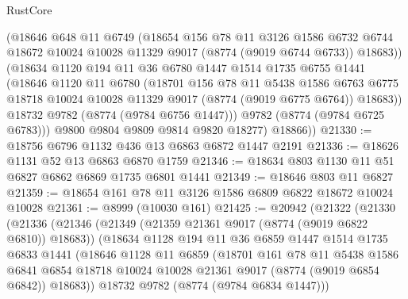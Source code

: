 \begin{lexlean}{RustCore}
\begin{coremodule}
            (@18646
              @648
              @11
              @6749
              (@18654
                @156
                @78
                @11
                @3126
                @1586
                @6732
                @6744
                @18672
                @10024
                @10028
                @11329
                @9017
                (@8774 (@9019 @6744 @6733))
                @18683))
            (@18634
              @1120
              @194
              @11
              @36
              @6780
              @1447
              @1514
              @1735
              @6755
              @1441
              (@18646
                @1120
                @11
                @6780
                (@18701
                  @156
                  @78
                  @11
                  @5438
                  @1586
                  @6763
                  @6775
                  @18718
                  @10024
                  @10028
                  @11329
                  @9017
                  (@8774 (@9019 @6775 @6764))
                  @18683))
              @18732
              @9782
              (@8774 (@9784 @6756 @1447)))
            @9782
            (@8774 (@9784 @6725 @6783)))
          @9800
          @9804
          @9809
          @9814
          @9820
          @18277)
        @18866))
@21330 := @18756 @6796 @1132 @436 @13 @6863 @6872 @1447 @2191
@21336 := @18626 @1131 @52 @13 @6863 @6870 @1759
@21346 := @18634 @803 @1130 @11 @51 @6827 @6862 @6869 @1735 @6801 @1441
@21349 := @18646 @803 @11 @6827
@21359 := @18654 @161 @78 @11 @3126 @1586 @6809 @6822 @18672 @10024 @10028
@21361 := @8999 (@10030 @161)
@21425 := @20942
    (@21322
      (@21330
        (@21336
          (@21346
            (@21349 (@21359 @21361 @9017 (@8774 (@9019 @6822 @6810)) @18683))
            (@18634
              @1128
              @194
              @11
              @36
              @6859
              @1447
              @1514
              @1735
              @6833
              @1441
              (@18646
                @1128
                @11
                @6859
                (@18701
                  @161
                  @78
                  @11
                  @5438
                  @1586
                  @6841
                  @6854
                  @18718
                  @10024
                  @10028
                  @21361
                  @9017
                  (@8774 (@9019 @6854 @6842))
                  @18683))
              @18732
              @9782
              (@8774 (@9784 @6834 @1447)))

\end{coremodule}
\end{lexlean}
